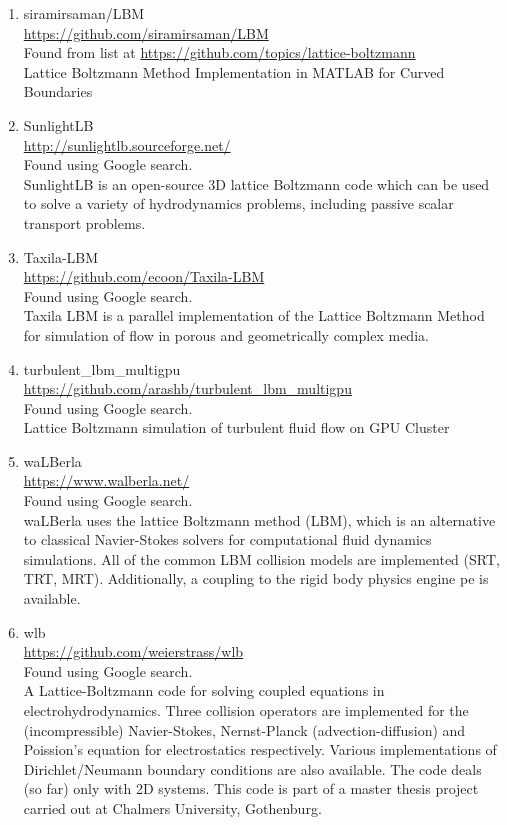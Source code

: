 \documentclass{article}
\begin{document}
\begin{enumerate}
\item siramirsaman/LBM
\\
\href{https://github.com/siramirsaman/LBM}{https://github.com/siramirsaman/LBM}
\\
Found from list at \href{https://github.com/topics/lattice-boltzmann}{https://github.com/topics/lattice-boltzmann}\\
Lattice Boltzmann Method Implementation in MATLAB for Curved Boundaries

\item SunlightLB \\
\href{http://sunlightlb.sourceforge.net/}{http://sunlightlb.sourceforge.net/}
\\
Found using Google search.\\
SunlightLB is an open-source 3D lattice Boltzmann code which can be used to solve a variety of hydrodynamics problems, including passive scalar transport problems.

\item Taxila-LBM
\\
\href{https://github.com/ecoon/Taxila-LBM}{https://github.com/ecoon/Taxila-LBM}
\\
Found using Google search.\\
Taxila LBM is a parallel implementation of the Lattice Boltzmann Method for simulation of flow in porous and geometrically complex media.

\item turbulent\_lbm\_multigpu
\\
\href{https://github.com/arashb/turbulent_lbm_multigpu}{https://github.com/arashb/turbulent\_lbm\_multigpu}
\\
Found using Google search.\\
Lattice Boltzmann simulation of turbulent fluid flow on GPU Cluster

\item waLBerla
\\
\href{https://www.walberla.net/}{https://www.walberla.net/}
\\
Found using Google search.\\
waLBerla uses the lattice Boltzmann method (LBM), which is an alternative to classical Navier-Stokes solvers for computational fluid dynamics simulations. All of the common LBM collision models are implemented (SRT, TRT, MRT). Additionally, a coupling to the rigid body physics engine pe is available. 

\item wlb
\\
\href{https://github.com/weierstrass/wlb}{https://github.com/weierstrass/wlb}
\\
Found using Google search.\\
A Lattice-Boltzmann code for solving coupled equations in electrohydrodynamics. 
Three collision operators are implemented for the (incompressible) Navier-Stokes, 
Nernst-Planck (advection-diffusion) and Poission's equation for electrostatics 
respectively. Various implementations of Dirichlet/Neumann boundary conditions 
are also available. The code deals (so far) only with 2D systems.
This code is part of a  master thesis project carried out at Chalmers University, 
Gothenburg.


\end{enumerate}
\end{document}
